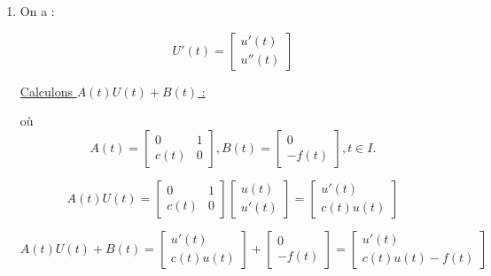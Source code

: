 \documentclass[12pt, letterpaper]{article}
\begin{document}
\begin{enumerate}

\item On a :

  \begin{equation*}
    U'(t) = \left[
    \begin{array}{l}
      u'(t) \\
      u''(t)
    \end{array}
    \right]
  \end{equation*}

  \underline{Calculons $A(t)U(t)+B(t)$ :}

  où \begin{equation*}
    A(t) = \left[
    \begin{array}{ll}
      0 & 1\\
      c(t) & 0
    \end{array}
    \right]
    ,
    B(t) = \left[
    \begin{array}{l}
      0 \\
      -f(t)
    \end{array}
    \right]
  , t \in I.
  \end{equation*}
  
  \begin{equation*}
    A(t)U(t) = \left[
    \begin{array}{ll}
      0 & 1\\
      c(t) & 0
    \end{array}
    \right]
    \left[
    \begin{array}{l}
      u(t) \\
      u'(t)
    \end{array}
    \right]
    =
    \left[
    \begin{array}{l}
      u'(t) \\
      c(t)u(t)
    \end{array}
    \right]
  \end{equation*}

  \begin{equation*}
    A(t)U(t) + B(t) =
    \left[
    \begin{array}{l}
      u'(t) \\
      c(t)u(t)
    \end{array}
    \right]
    +
    \left[
    \begin{array}{l}
      0 \\
      -f(t)
    \end{array}
    \right]
    =
    \left[
    \begin{array}{l}
      u'(t) \\
      c(t)u(t) - f(t)
    \end{array}
    \right]
  \end{equation*}


\end{enumerate}
\end{document}
